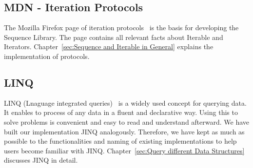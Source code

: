 \subsection{MDN - Iteration Protocols}
\label{sub:MDN - Iteration Protocols}
The Mozilla Firefox page of iteration protocols~\cite{mdn_protocols} is the basis for developing the
Sequence Library. The page contains all relevant facts about Iterable and
Iterators. Chapter~\ref{sec:Sequence and Iterable in General} explains the
implementation of protocols.

\subsection{LINQ}
\label{sub:LINQ}
LINQ (Lnaguage integrated queries)~\cite{billwagner_language-integrated_2023} 
is a widely used concept for querying data. It enables to process of any data
in a fluent and declarative way. Using this to solve problems is convenient and
easy to read and understand afterward.
We have built our implementation JINQ analogously. Therefore, we have kept as
much as possible to the functionalities and naming of existing implementations
to help users become familiar with JINQ.
Chapter~\ref{sec:Query different Data Structures} discusses JINQ in detail.
